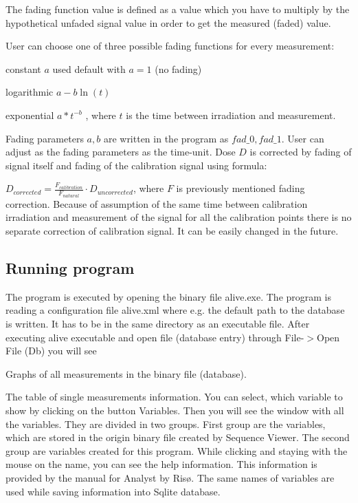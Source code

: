 The fading function value is defined as a value which you have to multiply by the hypothetical unfaded signal value in order to get the measured (faded) value. \par
 User can choose one of three possible fading functions for every measurement\-:
\begin{DoxyItemize}
\item constant $a$ used default with $a=1$ (no fading)
\item logarithmic $a-b\ln(t)$
\item exponential $a*t^{-b}$ , where $t$ is the time between irradiation and measurement.\par
 Fading parameters $a,b$ are written in the program as $fad\_0,fad\_1$. User can adjust as the fading parameters as the time-\/unit. Dose $D$ is corrected by fading of signal itself and fading of the calibration signal using formula\-:\par
 $D_{corrected}=\frac{F_{calibration}}{F_{natural}}\cdot D_{uncorrected}$, where $F$ is previously mentioned fading correction. Because of assumption of the same time between calibration irradiation and measurement of the signal for all the calibration points there is no separate correction of calibration signal. It can be easily changed in the future.
\end{DoxyItemize}\hypertarget{index_running_program}{}\subsection{Running program}\label{index_running_program}
The program is executed by opening the binary file {\ttfamily alive.\-exe}. The program is reading a configuration file {\ttfamily alive.\-xml} where e.\-g. the default path to the database is written. It has to be in the same directory as an executable file. After executing alive executable and open file (database entry) through {\ttfamily  File-\/$>$Open File (Db) } you will see \par
 
\begin{DoxyEnumerate}
\item Graphs of all measurements in the binary file (database). \par

\item The table of single measurements information. You can select, which variable to show by clicking on the button {\ttfamily Variables}. Then you will see the window with all the variables. They are divided in two groups. First group are the variables, which are stored in the origin binary file created by {\ttfamily Sequence Viewer}. The second group are variables created for this program. While clicking and staying with the mouse on the name, you can see the help information. This information is provided by the manual for {\ttfamily Analyst} by Risø. The same names of variables are used while saving information into {\ttfamily Sqlite} database.
\end{DoxyEnumerate}

